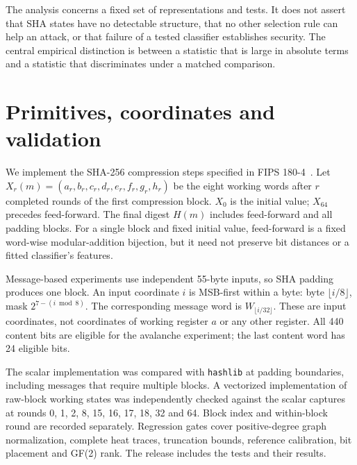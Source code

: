 \documentclass[11pt]{article}
\begin{document}
The analysis concerns a fixed set of representations and tests. It does not assert that SHA states have no detectable structure, that no other selection rule can help an attack, or that failure of a tested classifier establishes security. The central empirical distinction is between a statistic that is large in absolute terms and a statistic that discriminates under a matched comparison.

\section{Primitives, coordinates and validation}
We implement the SHA-256 compression steps specified in FIPS 180-4~\cite{nist}. Let $X_r(m)=(a_r,b_r,c_r,d_r,e_r,f_r,g_r,h_r)$ be the eight working words after $r$ completed rounds of the first compression block. $X_0$ is the initial value; $X_{64}$ precedes feed-forward. The final digest $H(m)$ includes feed-forward and all padding blocks. For a single block and fixed initial value, feed-forward is a fixed word-wise modular-addition bijection, but it need not preserve bit distances or a fitted classifier's features.

Message-based experiments use independent 55-byte inputs, so SHA padding produces one block. An input coordinate $i$ is MSB-first within a byte: byte $\lfloor i/8\rfloor$, mask $2^{7-(i\bmod8)}$. The corresponding message word is $W_{\lfloor i/32\rfloor}$. These are input coordinates, not coordinates of working register $a$ or any other register. All 440 content bits are eligible for the avalanche experiment; the last content word has 24 eligible bits.

The scalar implementation was compared with \texttt{hashlib} at padding boundaries, including messages that require multiple blocks. A vectorized implementation of raw-block working states was independently checked against the scalar captures at rounds 0, 1, 2, 8, 15, 16, 17, 18, 32 and 64. Block index and within-block round are recorded separately. Regression gates cover positive-degree graph normalization, complete heat traces, truncation bounds, reference calibration, bit placement and GF(2) rank. The release includes the tests and their results.
\end{document}

